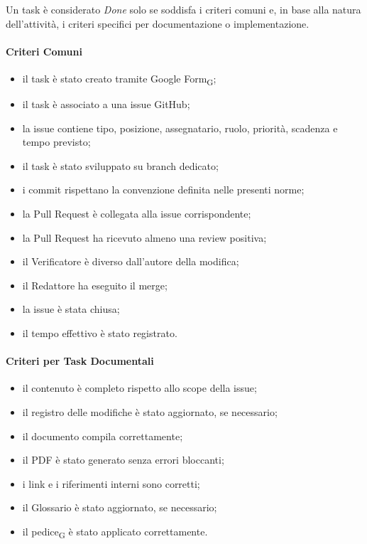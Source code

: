 Un task è considerato \textit{Done} solo se soddisfa i criteri comuni e, in base
alla natura dell'attività, i criteri specifici per documentazione o implementazione.

\paragraph{Criteri Comuni}

\begin{itemize}
    \item il task è stato creato tramite Google Form\textsubscript{G};
    \item il task è associato a una issue GitHub;
    \item la issue contiene tipo, posizione, assegnatario, ruolo, priorità, scadenza
    e tempo previsto;
    \item il task è stato sviluppato su branch dedicato;
    \item i commit rispettano la convenzione definita nelle presenti norme;
    \item la Pull Request è collegata alla issue corrispondente;
    \item la Pull Request ha ricevuto almeno una review positiva;
    \item il Verificatore è diverso dall'autore della modifica;
    \item il Redattore ha eseguito il merge;
    \item la issue è stata chiusa;
    \item il tempo effettivo è stato registrato.
\end{itemize}

\paragraph{Criteri per Task Documentali}

\begin{itemize}
    \item il contenuto è completo rispetto allo scope della issue;
    \item il registro delle modifiche è stato aggiornato, se necessario;
    \item il documento compila correttamente;
    \item il PDF è stato generato senza errori bloccanti;
    \item i link e i riferimenti interni sono corretti;
    \item il Glossario è stato aggiornato, se necessario;
    \item il pedice\textsubscript{G} è stato applicato correttamente.
\end{itemize}

